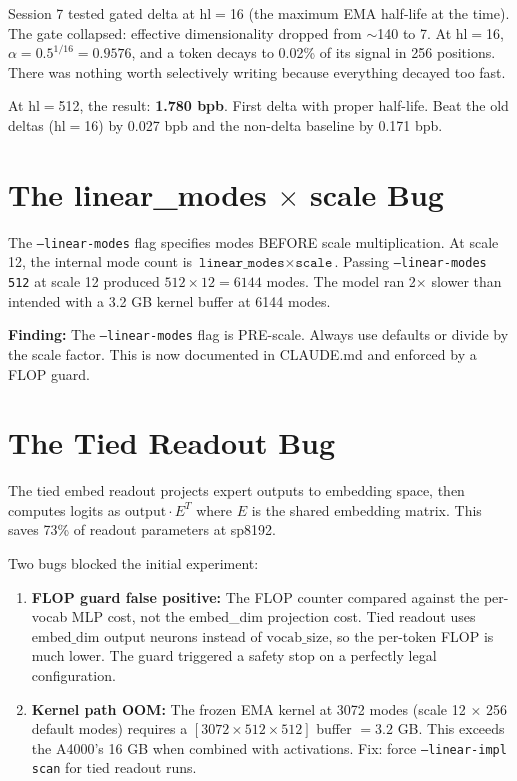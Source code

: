 \documentclass[11pt,a4paper]{report}
\newcommand{\finding}[1]{\textcolor{finding}{\textbf{Finding:}} #1}
\begin{document}
Session 7 tested gated delta at hl$=$16 (the maximum EMA half-life at the time). The gate collapsed: effective dimensionality dropped from $\sim$140 to 7. At hl$=$16, $\alpha = 0.5^{1/16} = 0.9576$, and a token decays to 0.02\% of its signal in 256 positions. There was nothing worth selectively writing because everything decayed too fast.

At hl$=$512, the result: \textbf{1.780 bpb}. First delta with proper half-life. Beat the old deltas (hl$=$16) by 0.027 bpb and the non-delta baseline by 0.171 bpb.

\section{The linear\_modes $\times$ scale Bug}

The \texttt{--linear-modes} flag specifies modes BEFORE scale multiplication. At scale 12, the internal mode count is $\texttt{linear\_modes} \times \texttt{scale}$. Passing \texttt{--linear-modes 512} at scale 12 produced $512 \times 12 = 6144$ modes. The model ran 2$\times$ slower than intended with a 3.2 GB kernel buffer at 6144 modes.

\finding{The \texttt{--linear-modes} flag is PRE-scale. Always use defaults or divide by the scale factor. This is now documented in CLAUDE.md and enforced by a FLOP guard.}

\section{The Tied Readout Bug}

The tied embed readout projects expert outputs to embedding space, then computes logits as $\text{output} \cdot E^T$ where $E$ is the shared embedding matrix. This saves 73\% of readout parameters at sp8192.

Two bugs blocked the initial experiment:

\begin{enumerate}[nosep]
\item \textbf{FLOP guard false positive:} The FLOP counter compared against the per-vocab MLP cost, not the embed\_dim projection cost. Tied readout uses $\text{embed\_dim}$ output neurons instead of $\text{vocab\_size}$, so the per-token FLOP is much lower. The guard triggered a safety stop on a perfectly legal configuration.

\item \textbf{Kernel path OOM:} The frozen EMA kernel at 3072 modes (scale 12 $\times$ 256 default modes) requires a $[3072 \times 512 \times 512]$ buffer $= 3.2$ GB. This exceeds the A4000's 16 GB when combined with activations. Fix: force \texttt{--linear-impl scan} for tied readout runs.
\end{enumerate}
\end{document}
